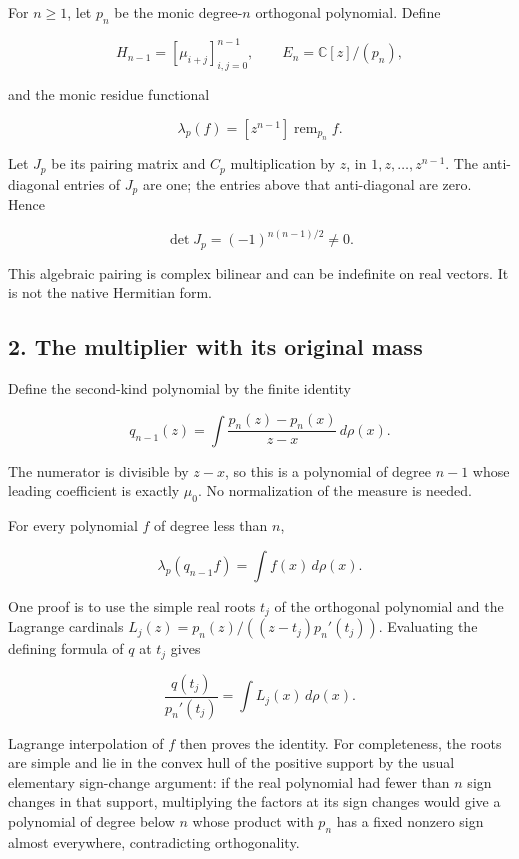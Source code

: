 For \(n\ge1\), let \(p_n\) be the monic degree-\(n\) orthogonal
polynomial. Define

\[
 H_{n-1}=[\mu_{i+j}]_{i,j=0}^{n-1},\qquad
 E_n=\mathbb C[z]/(p_n),
\]

and the monic residue functional

\[
 \lambda_p(f)=[z^{n-1}]\operatorname{rem}_{p_n}f.
\]

Let \(J_p\) be its pairing matrix and \(C_p\) multiplication by \(z\),
in \(1,z,\ldots,z^{n-1}\). The anti-diagonal entries of \(J_p\) are one;
the entries above that anti-diagonal are zero. Hence

\[
 \det J_p=(-1)^{n(n-1)/2}\ne0.
\]

This algebraic pairing is complex bilinear and can be indefinite on real
vectors. It is not the native Hermitian form.

\subsection{2. The multiplier with its original
mass}\label{the-multiplier-with-its-original-mass}

Define the second-kind polynomial by the finite identity

\[
 q_{n-1}(z)=\int\frac{p_n(z)-p_n(x)}{z-x}\,d\rho(x).
\]

The numerator is divisible by \(z-x\), so this is a polynomial of degree
\(n-1\) whose leading coefficient is exactly \(\mu_0\). No normalization
of the measure is needed.

For every polynomial \(f\) of degree less than \(n\),

\[
 \lambda_p(q_{n-1}f)=\int f(x)\,d\rho(x).
\]

One proof is to use the simple real roots \(t_j\) of the orthogonal
polynomial and the Lagrange cardinals
\(L_j(z)=p_n(z)/((z-t_j)p_n'(t_j))\). Evaluating the defining formula of
\(q\) at \(t_j\) gives

\[
 \frac{q(t_j)}{p_n'(t_j)}=\int L_j(x)\,d\rho(x).
\]

Lagrange interpolation of \(f\) then proves the identity. For
completeness, the roots are simple and lie in the convex hull of the
positive support by the usual elementary sign-change argument: if the
real polynomial had fewer than \(n\) sign changes in that support,
multiplying the factors at its sign changes would give a polynomial of
degree below \(n\) whose product with \(p_n\) has a fixed nonzero sign
almost everywhere, contradicting orthogonality.


